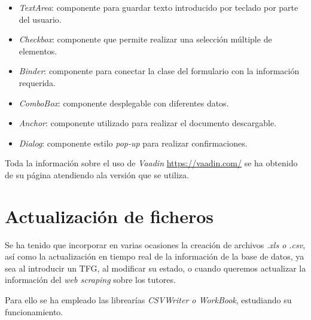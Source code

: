 \begin{itemize}
	\item \emph{TextArea}: componente para guardar texto introducido por teclado por parte del usuario.
	\item \emph{Checkbox}: componente que permite realizar una selección múltiple de elementos.
	\item \emph{Binder}: componente para conectar la clase del formulario con la información requerida.
	\item \emph{ComboBox}: componente desplegable con diferentes datos.
	\item \emph{Anchor}: componente utilizado para realizar el documento descargable.
	\item \emph{Dialog}: componente estilo \emph{pop-up} para realizar confirmaciones.

\end{itemize}

Toda la información sobre el uso de \emph{Vaadin} \url{https://vaadin.com/} se ha obtenido de su página atendiendo ala versión que se utiliza.

\section{Actualización de ficheros}

Se ha tenido que incorporar en varias ocasiones la creación de archivos \emph{.xls o .csv}, así como la actualización en tiempo real de la información de la base de datos, ya sea al introducir un TFG, al modificar su estado, o cuando queremos actualizar la información del \emph{web scraping} sobre los tutores.

Para ello se ha empleado las librearías \emph{CSVWriter o WorkBook}, estudiando su funcionamiento.
